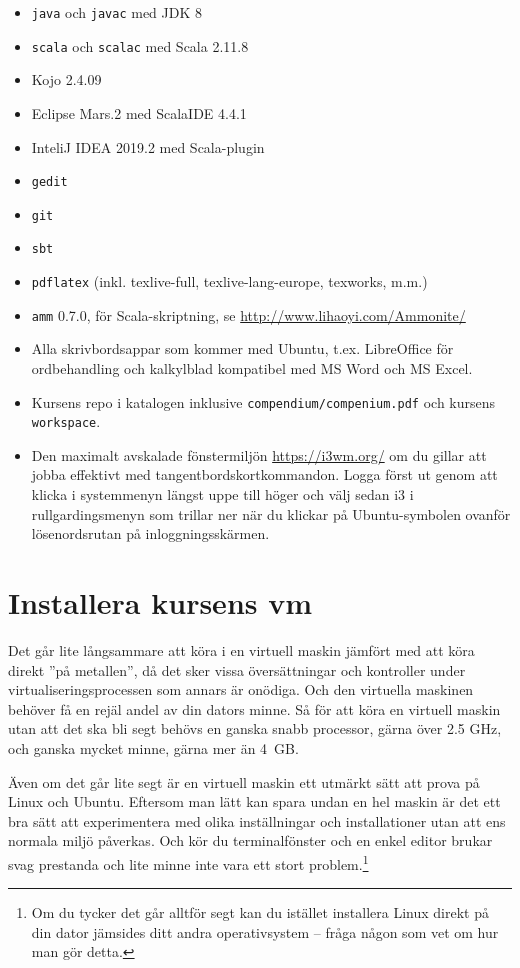 \begin{itemize}
\item \texttt{java} och \texttt{javac} med JDK 8
\item \texttt{scala} och \texttt{scalac} med Scala 2.11.8
\item Kojo 2.4.09
\item Eclipse Mars.2 med ScalaIDE 4.4.1
\item InteliJ IDEA 2019.2 med Scala-plugin
\item \texttt{gedit}
\item \texttt{git}
\item \texttt{sbt}
\item \texttt{pdflatex} (inkl. texlive-full, texlive-lang-europe, texworks, m.m.) 
\item \texttt{amm} 0.7.0, för Scala-skriptning, se \url{http://www.lihaoyi.com/Ammonite/}
\item Alla skrivbordsappar som kommer med Ubuntu, t.ex. LibreOffice för ordbehandling och kalkylblad kompatibel med MS Word och MS Excel.
\item Kursens repo i katalogen  inklusive  \texttt{compendium/compenium.pdf} och kursens \texttt{workspace}.
\item Den maximalt avskalade fönstermiljön \url{https://i3wm.org/} om du gillar att jobba effektivt med tangentbordskortkommandon. Logga först ut genom att klicka i systemmenyn längst uppe till höger och välj sedan i3 i rullgardingsmenyn som trillar ner när du klickar på Ubuntu-symbolen ovanför lösenordsrutan på inloggningsskärmen.
\end{itemize}

\section{Installera kursens vm}

Det går lite långsammare att köra i en virtuell maskin jämfört med att köra direkt ''på metallen'', då det sker vissa översättningar och kontroller under virtualiseringsprocessen som annars är onödiga. Och den virtuella maskinen behöver få en rejäl andel av din dators minne. Så för att köra en virtuell maskin utan att det ska bli segt behövs en ganska snabb processor, gärna över 2.5 GHz, och ganska mycket minne, gärna mer än 4~GB. 

Även om det går lite segt är en virtuell maskin ett utmärkt sätt att prova på Linux och Ubuntu. Eftersom man lätt kan spara undan en hel maskin är det ett bra sätt att experimentera med olika inställningar och installationer utan att ens normala miljö påverkas. Och kör du terminalfönster och en enkel editor brukar svag prestanda och lite minne inte vara ett stort problem.\footnote{Om du tycker det går alltför segt kan du istället installera Linux direkt på din dator jämsides ditt andra operativsystem -- fråga någon som vet om hur man gör detta.} 

